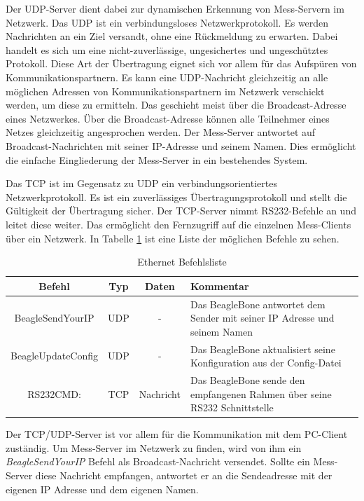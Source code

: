 Der UDP-Server dient dabei zur dynamischen Erkennung von Mess-Servern im Netzwerk. Das \ac{UDP} ist ein verbindungsloses Netzwerkprotokoll. Es werden Nachrichten an ein Ziel versandt, ohne eine Rückmeldung zu erwarten. Dabei handelt es sich um eine nicht-zuverlässige, ungesichertes und ungeschütztes Protokoll. Diese Art der Übertragung eignet sich vor allem für das Aufspüren von Kommunikationspartnern. Es kann eine UDP-Nachricht gleichzeitig an alle möglichen Adressen von Kommunikationspartnern im Netzwerk verschickt werden, um diese zu ermitteln. Das geschieht meist über die Broadcast-Adresse eines Netzwerkes. Über die Broadcast-Adresse können alle Teilnehmer eines Netzes gleichzeitig angesprochen werden. Der Mess-Server antwortet auf Broadcast-Nachrichten mit seiner IP-Adresse und seinem Namen. Dies ermöglicht die einfache Eingliederung der Mess-Server in ein bestehendes System.\ 

Das \ac{TCP} ist im Gegensatz zu \ac{UDP} ein verbindungsorientiertes Netzwerkprotokoll. Es ist ein zuverlässiges Übertragungsprotokoll und stellt die Gültigkeit der Übertragung sicher. Der TCP-Server nimmt RS232-Befehle an und leitet diese weiter. Das ermöglicht den Fernzugriff auf die einzelnen Mess-Clients über ein Netzwerk. In Tabelle \ref{table_EthernetCommands} ist eine Liste der möglichen Befehle zu sehen.\\

\begin{table}[H]
\begin{center}
\begin{tabularx}{\textwidth}{|c|c|c|X|}\hline 
 Befehl & Typ & Daten & Kommentar \\ \hline
 BeagleSendYourIP & UDP & - & Das BeagleBone antwortet dem Sender mit seiner IP Adresse und seinem Namen  \\ \hline
 BeagleUpdateConfig & UDP & - & Das BeagleBone aktualisiert seine Konfiguration aus der Config-Datei \\ \hline
 RS232CMD: & TCP & Nachricht & Das BeagleBone sende den empfangenen Rahmen über seine RS232 Schnittstelle \\ \hline
\end{tabularx}
\caption{Ethernet Befehlsliste}
\label{table_EthernetCommands}
\end{center}
\end{table}

Der TCP/UDP-Server ist vor allem für die Kommunikation mit dem PC-Client zuständig. Um Mess-Server im Netzwerk zu finden, wird von ihm ein \textit{BeagleSendYourIP} Befehl als Broadcast-Nachricht versendet. Sollte ein Mess-Server diese Nachricht empfangen, antwortet er an die Sendeadresse mit der eigenen IP Adresse und dem eigenen Namen.\ 

